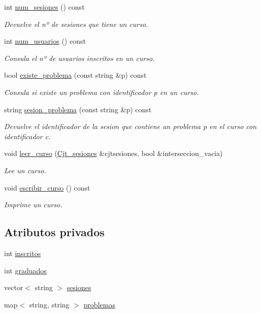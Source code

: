 \begin{DoxyCompactItemize}
int \mbox{\hyperlink{class_curso_a1cf7c335137c295ea160a9682c10c07a}{num\+\_\+sesiones}} () const
\begin{DoxyCompactList}\small\item\em Devuelve el nº de sesiones que tiene un curso. \end{DoxyCompactList}\item 
int \mbox{\hyperlink{class_curso_a8141469f11a8e4431540314577d4bee2}{num\+\_\+usuarios}} () const
\begin{DoxyCompactList}\small\item\em Consula el nº de usuarios inscritos en un curso. \end{DoxyCompactList}\item 
bool \mbox{\hyperlink{class_curso_a279017923bd7d0b21961953690e3bacc}{existe\+\_\+problema}} (const string \&p) const
\begin{DoxyCompactList}\small\item\em Consula si existe un problema con identificador p en un curso. \end{DoxyCompactList}\item 
string \mbox{\hyperlink{class_curso_ac70e956fb7a0511e5fbdd097a689b69f}{sesion\+\_\+problema}} (const string \&p) const
\begin{DoxyCompactList}\small\item\em Devuelve el identificador de la sesion que contiene un problema p en el curso con identificador c. \end{DoxyCompactList}\item 
void \mbox{\hyperlink{class_curso_a35e0418ee2dba118a984c5f56d82c371}{leer\+\_\+curso}} (\mbox{\hyperlink{class_cjt__sesiones}{Cjt\+\_\+sesiones}} \&cjtsesiones, bool \&interseccion\+\_\+vacia)
\begin{DoxyCompactList}\small\item\em Lee un curso. \end{DoxyCompactList}\item 
void \mbox{\hyperlink{class_curso_a2c23a6c3350979d86b555cbd8ab9665d}{escribir\+\_\+curso}} () const
\begin{DoxyCompactList}\small\item\em Imprime un curso. \end{DoxyCompactList}\end{DoxyCompactItemize}
\subsection*{Atributos privados}
\begin{DoxyCompactItemize}
\item 
int \mbox{\hyperlink{class_curso_aef03f588dd91d57a6e679d05148fd971}{inscritos}}
\item 
int \mbox{\hyperlink{class_curso_abf52f538c449c083d4c067a3329c6af2}{graduados}}
\item 
vector$<$ string $>$ \mbox{\hyperlink{class_curso_acd47bc8fe2f8121284246241d1e1dab5}{sesiones}}
\item 
map$<$ string, string $>$ \mbox{\hyperlink{class_curso_a56b39dae4abfc058cf57956af639f1cb}{problemas}}
\end{DoxyCompactItemize}


